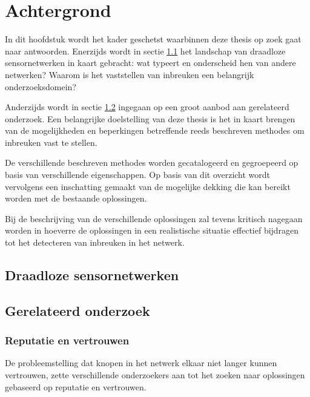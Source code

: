 \chapter{Achtergrond}
\label{chapter:achtergrond}

In dit hoofdstuk wordt het kader geschetst waarbinnen deze thesis op zoek gaat
naar antwoorden. Enerzijds wordt in sectie \ref{section:landscape} het
landschap van draadloze sensornetwerken in kaart gebracht: wat typeert en
onderscheid hen van andere netwerken? Waarom is het vaststellen van inbreuken
een belangrijk onderzoeksdomein?

Anderzijds wordt in sectie \ref{section:related} ingegaan op een groot aanbod
aan gerelateerd onderzoek. Een belangrijke doelstelling van deze thesis is het
in kaart brengen van de mogelijkheden en beperkingen betreffende reeds
beschreven methodes om inbreuken vast te stellen.

De verschillende beschreven methodes worden gecatalogeerd en gegroepeerd op
basis van verschillende eigenschappen. Op basis van dit overzicht wordt
vervolgens een inschatting gemaakt van de mogelijke dekking die kan bereikt
worden met de bestaande oplossingen.

Bij de beschrijving van de verschillende oplossingen zal tevens kritisch
nagegaan worden in hoeverre de oplossingen in een realistische situatie
effectief bijdragen tot het detecteren van inbreuken in het netwerk.

\section{Draadloze sensornetwerken}
\label{section:landscape}

\TODO

\section{Gerelateerd onderzoek}
\label{section:related}

\TODO

\subsection{Reputatie en vertrouwen}

De probleemstelling dat knopen in het netwerk elkaar niet langer kunnen
vertrouwen, zette verschillende onderzoekers aan tot het zoeken naar
oplossingen gebaseerd op reputatie en vertrouwen.

